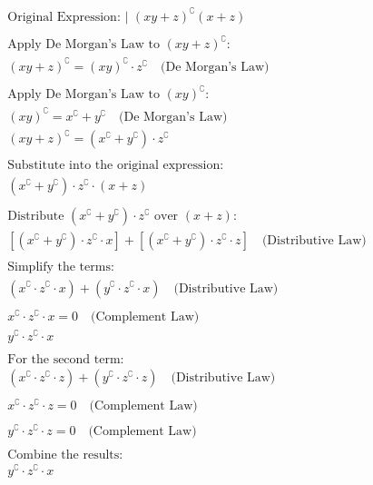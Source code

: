\documentclass{article}
\begin{document}
	
	\begin{gather*}
		\text{Original Expression:  |  }   (xy + z)^\complement(x + z) \\
		\text{} \\
		\text{Apply De Morgan's Law to } (xy + z)^\complement: \\
		(xy + z)^\complement = (xy)^\complement \cdot z^\complement \quad \text{(De Morgan's Law)} \\
		\text{} \\
		\text{Apply De Morgan's Law to } (xy)^\complement: \\
		(xy)^\complement = x^\complement + y^\complement \quad \text{(De Morgan's Law)} \\
		(xy + z)^\complement = (x^\complement + y^\complement) \cdot z^\complement \\
		\text{} \\
		\text{Substitute into the original expression:} \\
		(x^\complement + y^\complement) \cdot z^\complement \cdot (x + z) \\
		\text{} \\
		\text{Distribute } (x^\complement + y^\complement) \cdot z^\complement \text{ over } (x + z): \\
		[(x^\complement + y^\complement) \cdot z^\complement \cdot x] + [(x^\complement + y^\complement) \cdot z^\complement \cdot z] \quad \text{(Distributive Law)} \\
		\text{} \\
		\text{Simplify the terms:} \\
		(x^\complement \cdot z^\complement \cdot x) + (y^\complement \cdot z^\complement \cdot x) \quad \text{(Distributive Law)} \\
		\text{} \\
		x^\complement \cdot z^\complement \cdot x = 0 \quad \text{(Complement Law)} \\
		y^\complement \cdot z^\complement \cdot x \\
		\text{} \\
		\text{For the second term:} \\
		(x^\complement \cdot z^\complement \cdot z) + (y^\complement \cdot z^\complement \cdot z) \quad
		\text{(Distributive Law)} \\
		\text{} \\
		x^\complement \cdot z^\complement \cdot z = 0 \quad \text{(Complement Law)} \\
		\text{} \\
		y^\complement \cdot z^\complement \cdot z = 0 \quad \text{(Complement Law)} \\
		\text{} \\
		\text{Combine the results:} \\
		y^\complement \cdot z^\complement \cdot x
	\end{gather*}
	
\end{document}

